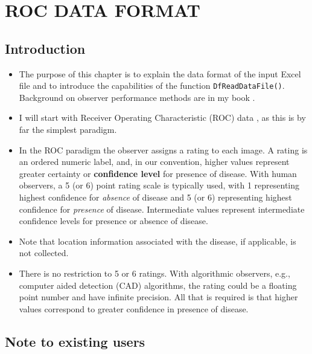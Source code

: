 \documentclass[
]{book}
\providecommand{\tightlist}{%
  \setlength{\itemsep}{0pt}\setlength{\parskip}{0pt}}
\begin{document}
\hypertarget{rocdataformat}{%
\chapter{ROC DATA FORMAT}\label{rocdataformat}}

\hypertarget{introduction-1}{%
\section{Introduction}\label{introduction-1}}

\begin{itemize}
\tightlist
\item
  The purpose of this chapter is to explain the data format of the input Excel file and to introduce the capabilities of the function \texttt{DfReadDataFile()}. Background on observer performance methods are in my book \citep{RN2680}.
\item
  I will start with Receiver Operating Characteristic (ROC) data \citep{RN1766}, as this is by far the simplest paradigm.
\item
  In the ROC paradigm the observer assigns a rating to each image. A rating is an ordered numeric label, and, in our convention, higher values represent greater certainty or \textbf{confidence level} for presence of disease. With human observers, a 5 (or 6) point rating scale is typically used, with 1 representing highest confidence for \emph{absence} of disease and 5 (or 6) representing highest confidence for \emph{presence} of disease. Intermediate values represent intermediate confidence levels for presence or absence of disease.
\item
  Note that location information associated with the disease, if applicable, is not collected.
\item
  There is no restriction to 5 or 6 ratings. With algorithmic observers, e.g., computer aided detection (CAD) algorithms, the rating could be a floating point number and have infinite precision. All that is required is that higher values correspond to greater confidence in presence of disease.
\end{itemize}

\hypertarget{note-to-existing-users}{%
\section{Note to existing users}\label{note-to-existing-users}}
\end{document}
